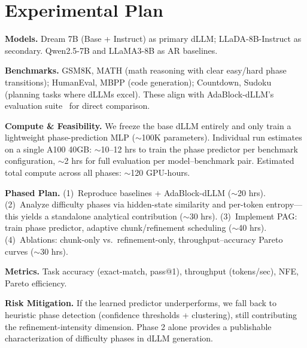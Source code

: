 \documentclass[11pt]{article}
\begin{document}
\section{Experimental Plan}

\textbf{Models.} Dream 7B (Base + Instruct) as primary dLLM; LLaDA-8B-Instruct as secondary. Qwen2.5-7B and LLaMA3-8B as AR baselines.

\textbf{Benchmarks.} GSM8K, MATH (math reasoning with clear easy/hard phase transitions); HumanEval, MBPP (code generation); Countdown, Sudoku (planning tasks where dLLMs excel). These align with AdaBlock-dLLM's evaluation suite~\citep{lu2025adablock} for direct comparison.

\textbf{Compute \& Feasibility.} We freeze the base dLLM entirely and only train a lightweight phase-prediction MLP ($\sim$100K parameters). Individual run estimates on a single A100 40GB: $\sim$10--12 hrs to train the phase predictor per benchmark configuration, $\sim$2 hrs for full evaluation per model--benchmark pair. Estimated total compute across all phases: $\sim$120 GPU-hours.

\textbf{Phased Plan.} (1)~Reproduce baselines + AdaBlock-dLLM ($\sim$20 hrs). (2)~Analyze difficulty phases via hidden-state similarity and per-token entropy---this yields a standalone analytical contribution ($\sim$30 hrs). (3)~Implement PAG: train phase predictor, adaptive chunk/refinement scheduling ($\sim$40 hrs). (4)~Ablations: chunk-only vs.\ refinement-only, throughput--accuracy Pareto curves ($\sim$30 hrs).

\textbf{Metrics.} Task accuracy (exact-match, pass@1), throughput (tokens/sec), NFE, Pareto efficiency.

\textbf{Risk Mitigation.} If the learned predictor underperforms, we fall back to heuristic phase detection (confidence thresholds + clustering), still contributing the refinement-intensity dimension. Phase 2 alone provides a publishable characterization of difficulty phases in dLLM generation.


\end{document}
